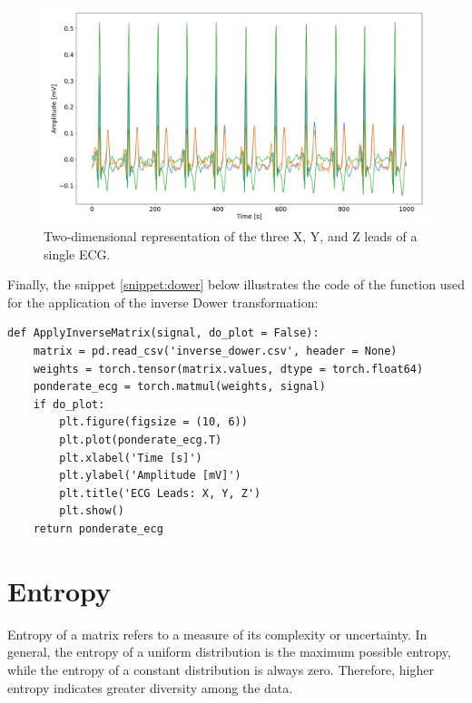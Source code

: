 \documentclass[12pt,italian]{report}
\begin{document}
\begin{figure}[H]
    \centering
    \includegraphics[width=1\textwidth]{images/frank_2d.png}
    \captionsetup{justification=centering}
    \caption{Two-dimensional representation of the three X, Y, and Z leads of a single ECG.}
    \label{fig:frank_2d}
\end{figure}

Finally, the snippet \ref{snippet:dower} below illustrates the code of the function used for the application of the inverse Dower transformation:

\lstset{language=Python}
\begin{lstlisting}[aboveskip=15pt, belowskip=15pt, basicstyle=\fontsize{8}{10}\selectfont, keywordstyle=\color{blue}, breaklines=true, label=snippet:dower]
def ApplyInverseMatrix(signal, do_plot = False):
    matrix = pd.read_csv('inverse_dower.csv', header = None)
    weights = torch.tensor(matrix.values, dtype = torch.float64)
    ponderate_ecg = torch.matmul(weights, signal)
    if do_plot:
        plt.figure(figsize = (10, 6))
        plt.plot(ponderate_ecg.T)
        plt.xlabel('Time [s]')
        plt.ylabel('Amplitude [mV]')
        plt.title('ECG Leads: X, Y, Z')
        plt.show()
    return ponderate_ecg
\end{lstlisting}

\section{Entropy}
\label{sec:entropia}

Entropy of a matrix refers to a measure of its complexity or uncertainty. In general, the entropy of a uniform distribution is the maximum possible entropy, while the entropy of a constant distribution is always zero. Therefore, higher entropy indicates greater diversity among the data.
\end{document}
